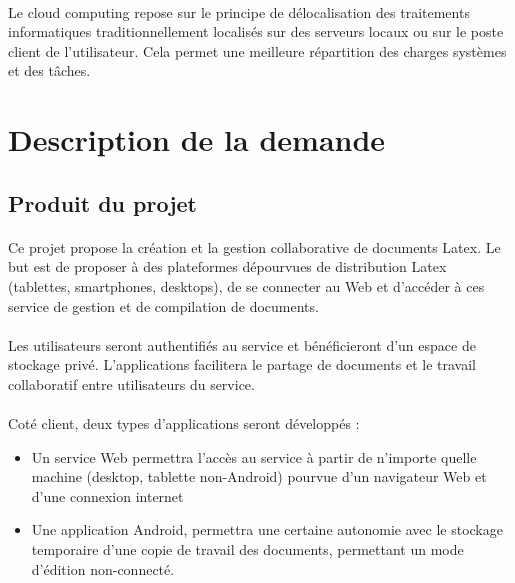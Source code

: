 \documentclass[a4paper,12pt]{article}
\begin{document}
\paragraph*{}
Le cloud computing repose sur le principe de délocalisation des traitements informatiques
 traditionnellement localisés sur des serveurs locaux ou sur le poste client de l'utilisateur. Cela 
permet une meilleure répartition des charges systèmes et des tâches.

\section{Description de la demande}

\subsection{Produit du projet}
 	
\paragraph*{} 
Ce projet propose la création et la gestion collaborative de documents
Latex. Le but est de proposer à des plateformes dépourvues de distribution
Latex (tablettes, smartphones, desktops), de se connecter au Web et
d’accéder à ces service de gestion et de compilation de documents.
\paragraph*{} 
Les utilisateurs seront authentifiés au service et bénéficieront d’un espace
de stockage privé. L'applications facilitera le partage de documents et le
travail collaboratif entre utilisateurs du service.
\paragraph*{} 
Coté client, deux types d'applications seront développés :\\

\begin{itemize}
 \item Un service Web permettra l’accès au service à partir de n’importe
quelle machine (desktop, tablette non-Android) pourvue d’un navigateur
Web et d’une connexion internet

 \item Une application Android, permettra une certaine autonomie avec le
stockage temporaire d’une copie de travail des documents, permettant
un mode d’édition non-connecté.
\end{itemize}
\newpage
\end{document}
